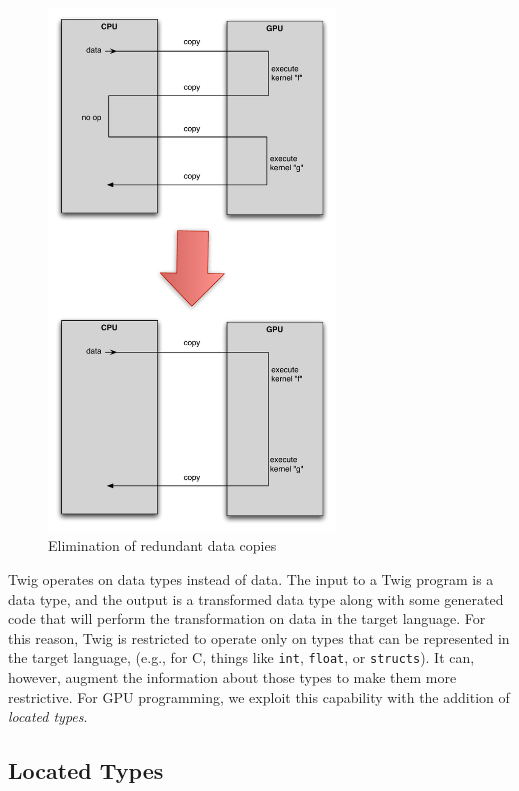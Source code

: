 \begin{figure}[ht]
\label{basic-idea}
\begin{center}
\includegraphics[width=3.0in]{images/basic-idea}
\caption{Elimination of redundant data copies}
\end{center}
\end{figure}

Twig operates on data types instead of data. The input to a Twig program is a
data type, and the output is a transformed data type along with some generated
code that will perform the transformation on data in the target language. For
this reason, Twig is restricted to operate only on types that can be represented
in the target language, (e.g., for C, things like \texttt{int}, \texttt{float},
or \texttt{structs}). It can, however, augment the information about those types
to make them more restrictive. For GPU programming, we exploit this capability
with the addition of \emph{located types}.

\subsection{Located Types}
\label{sec:located-types}



